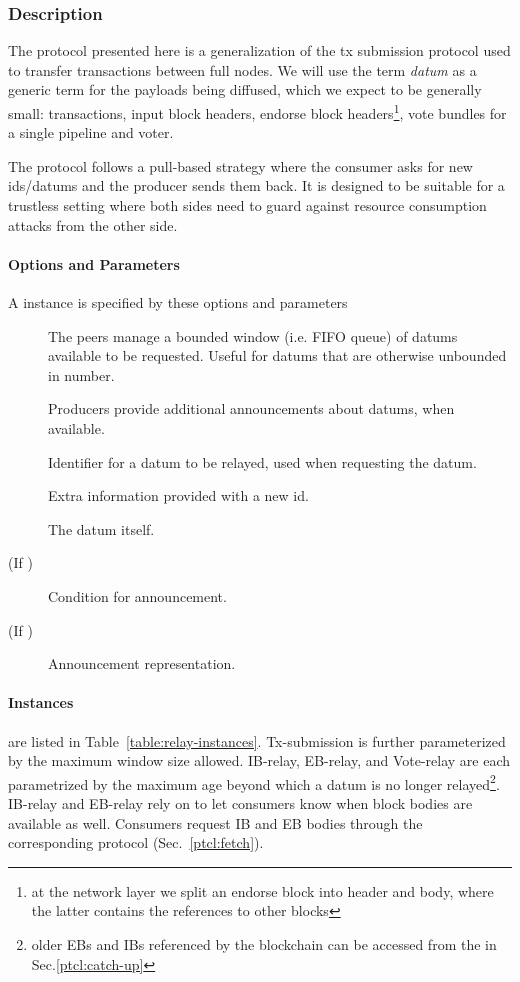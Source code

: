 \subsubsection{Description}
The \relay protocol presented here is a generalization of the tx
submission protocol used to transfer transactions between full
nodes. We will use the term \emph{datum} as a generic term for the
payloads being diffused, which we expect to be generally small:
transactions, input block headers, endorse block headers\footnote{at
the network layer we split an endorse block into header and body,
where the latter contains the references to other blocks}, vote
bundles for a single pipeline and voter.

The protocol follows a pull-based strategy where the consumer asks for
new ids/datums and the producer sends them back. It is designed to be
suitable for a trustless setting where both sides need to guard
against resource consumption attacks from the other side.

\paragraph{Options and Parameters} A \relay{} instance is specified by these options and parameters
\begin{description}
\item [\BoundedWindow] The peers manage a bounded window (i.e. FIFO queue) of datums available to be requested. Useful for datums that are otherwise unbounded in number.
\item [\Announcements] Producers provide additional announcements about datums, when available.
\item [\id{}] Identifier for a datum to be relayed, used when requesting the datum.
\item [\info{}] Extra information provided with a new id.
\item [\datum{}] The datum itself.
\item [\annCond{} (If \Announcements)] Condition for announcement.
\item [\ann{} (If \Announcements)] Announcement representation.
\end{description}

\paragraph{Instances} are listed in Table~\ref{table:relay-instances}.
Tx-submission is further parameterized by the maximum window size
allowed. IB-relay, EB-relay, and Vote-relay are each parametrized by
the maximum age beyond which a datum is no longer
relayed\footnote{older EBs and IBs referenced by the blockchain can be
accessed from the \catchup{} in Sec.\ref{ptcl:catch-up}}. IB-relay and
EB-relay rely on \Announcements{} to let consumers know when block bodies
are available as well. Consumers request IB and EB bodies through the corresponding
\fetch{} protocol (Sec.~\ref{ptcl:fetch}).

